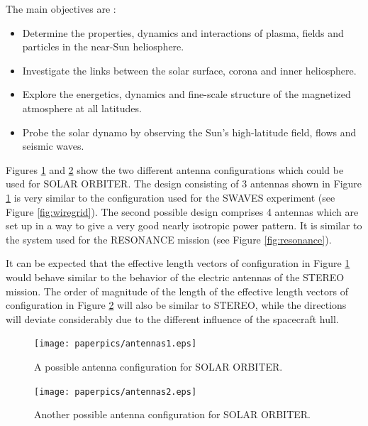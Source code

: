 \documentclass[a4paper,twocolumn]{esapub2005} %
\begin{document}
The main objectives are :

\begin{itemize}
    \item Determine the properties, dynamics and interactions of plasma, fields and particles in the near-Sun heliosphere.
    \item Investigate the links between the solar surface, corona and inner heliosphere.
    \item Explore the energetics, dynamics and fine-scale structure of the magnetized atmosphere at all latitudes.
    \item Probe the solar dynamo by observing the Sun's high-latitude field, flows and seismic waves.
\end{itemize}


Figures \ref{fig:antennas1} and \ref{fig:antennas2} show the two different antenna configurations which could be used for SOLAR ORBITER. The design consisting of 3 antennas shown in Figure \ref{fig:antennas1} is very similar to the configuration used for the SWAVES experiment (see Figure \ref{fig:wiregrid}). The second possible design comprises 4 antennas which are set up in a way to give a very good nearly isotropic power pattern. It is similar to the system used for the RESONANCE mission (see Figure \ref{fig:resonance}).

It can be expected that the effective length vectors of configuration in Figure \ref{fig:antennas1} would behave similar to the behavior of the electric antennas of the STEREO mission. The order of magnitude of the length of the effective length vectors of configuration in Figure \ref{fig:antennas2} will also be similar to STEREO, while the directions will deviate considerably due to the different influence of the spacecraft hull.

\begin{figure}
\centering
  \texttt{[image: paperpics/antennas1.eps]}
\caption{A possible antenna configuration for SOLAR ORBITER.\label{fig:antennas1}}
\end{figure}

\begin{figure}
\centering
  \texttt{[image: paperpics/antennas2.eps]}
\caption{Another possible antenna configuration for SOLAR ORBITER.\label{fig:antennas2}}
\end{figure}
\end{document}
